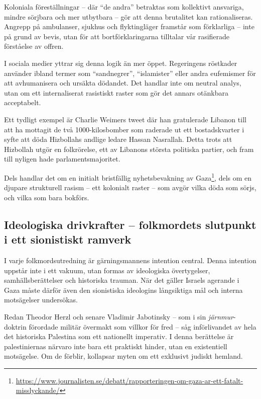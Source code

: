 \documentclass[12pt]{article}
\begin{document}
Koloniala föreställningar – där \enquote{de andra} betraktas som kollektivt ansvariga, mindre sörjbara och mer utbytbara – gör att denna brutalitet kan rationaliseras. Angrepp på ambulanser, sjukhus och flyktingläger framstår som förklarliga – inte på grund av bevis, utan för att bortförklaringarna tilltalar vår rasifierade förståelse av offren.

I sociala medier yttrar sig denna logik än mer öppet. Regeringens röstkader använder ibland termer som \enquote{sandnegrer}, \enquote{islamister} eller andra eufemismer för att avhumanisera och ursäkta dödandet. Det handlar inte om neutral analys, utan om ett internaliserat rasistiskt raster som gör det annars otänkbara acceptabelt.

Ett tydligt exempel är Charlie Weimers tweet där han gratulerade Libanon till att ha mottagit de två 1000-kilosbomber som raderade ut ett bostadskvarter i syfte att döda Hizbollahs andlige ledare Hassan Nasrallah. Detta trots att Hizbollah utgör en folkrörelse, ett av Libanons största politiska partier, och fram till nyligen hade parlamentsmajoritet.

Dels handlar det om en initialt bristfällig nyhetsbevakning av Gaza\footnote{\url{https://www.journalisten.se/debatt/rapporteringen-om-gaza-ar-ett-fatalt-misslyckande/}}, dels om en djupare strukturell rasism – ett kolonialt raster – som avgör vilka döda som sörjs, och vilka som bara bokförs.

\subsection{Ideologiska drivkrafter – folkmordets slutpunkt i ett sionistiskt ramverk}

I varje folkmordsutredning är gärningsmannens intention central. Denna intention uppstår inte i ett vakuum, utan formas av ideologiska övertygelser, samhällsberättelser och historiska trauman. När det gäller Israels agerande i Gaza måste därför även den sionistiska ideologins långsiktiga mål och interna motsägelser undersökas.

Redan Theodor Herzl och senare Vladimir Jabotinsky – som i sin \textit{järnmur}-doktrin förordade militär övermakt som villkor för fred – såg införlivandet av hela det historiska Palestina som ett nationellt imperativ. I denna berättelse är palestiniernas närvaro inte bara ett praktiskt hinder, utan en existentiell motsägelse. Om de förblir, kollapsar myten om ett exklusivt judiskt hemland.
\end{document}
